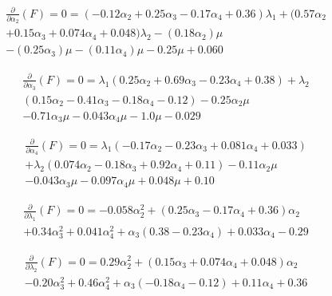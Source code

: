 \begin{equation}
\begin{array}{c}
\frac{\partial}{\partial \alpha_2}(F) = 0 = (-0.12 {\alpha_2}+0.25 {\alpha_3}-0.17 {\alpha_4}+0.36) {\lambda_1}+(0.57 {\alpha_2}\\+0.15 {\alpha_3}+0.074 {\alpha_4}+0.048) {\lambda_2}-(0.18 {\alpha_2}) \mu \\-(0.25 {\alpha_3}) \mu -(0.11 {\alpha_4}) \mu -0.25 \mu +0.060
\end{array}
\end{equation}

\begin{equation}
\begin{array}{c}
\frac{\partial}{\partial \alpha_3}(F) = 0 = {\lambda_1} (0.25 {\alpha_2}+0.69 {\alpha_3}-0.23 {\alpha_4}+0.38)+{\lambda_2}\\ (0.15 {\alpha_2}-0.41 {\alpha_3}-0.18 {\alpha_4}-0.12)-0.25 {\alpha_2} \mu\\ -0.71 {\alpha_3} \mu -0.043 {\alpha_4} \mu -1.0 \mu -0.029
\end{array}
\end{equation}

\begin{equation}
\begin{array}{c}
\frac{\partial}{\partial \alpha_4}(F) = 0 = {\lambda_1} (-0.17 {\alpha_2}-0.23 {\alpha_3}+0.081 {\alpha_4}+0.033)\\+{\lambda_2} (0.074 {\alpha_2}-0.18 {\alpha_3}+0.92 {\alpha_4}+0.11)-0.11 {\alpha_2} \mu\\ -0.043 {\alpha_3} \mu -0.097 {\alpha_4} \mu +0.048 \mu +0.10
\end{array}
\end{equation}

\begin{equation}
\begin{array}{c}
\frac{\partial}{\partial \lambda_1}(F) = 0 =-0.058 \alpha_2^2+(0.25 \alpha_3-0.17 \alpha_4+0.36) \alpha_2\\+0.34 \alpha_3^2+0.041 \alpha_4^2+\alpha_3 (0.38-0.23 \alpha_4)+0.033 \alpha_4-0.29
\end{array}
\end{equation}

\begin{equation}
\begin{array}{c}
\frac{\partial}{\partial \lambda_2}(F) = 0 =0.29 \alpha_2^2+(0.15 \alpha_3+0.074 \alpha_4+0.048) \alpha_2\\-0.20 \alpha_3^2+0.46 \alpha_4^2+\alpha_3 (-0.18 \alpha_4-0.12)+0.11 \alpha_4+0.36
\end{array}
\end{equation}

